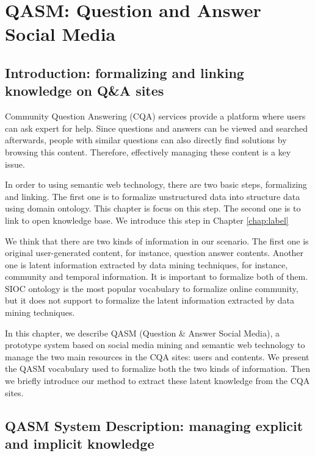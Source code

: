 \chapter{QASM: Question and Answer Social Media}
\doublespacing
\label{chap:qasm}
\minitoc

\section{Introduction: formalizing and linking knowledge on Q\&A sites}
Community Question Answering (CQA) services provide a platform where users can ask expert for help. Since questions and answers can be viewed and searched afterwards, people with similar questions can also directly find solutions by browsing this content. Therefore, effectively managing these content is a key issue. 

In order to using semantic web technology, there are two basic steps, formalizing and linking. The first one is to formalize unstructured data into structure data using domain ontology. This chapter is focus on this step. The second one is to link to open knowledge base. We introduce this step in Chapter \ref{chap:label}

We think that there are two kinds of information in our scenario. The first one is original user-generated content, for instance, question answer contents. Another one is latent information extracted by data mining techniques, for instance, community and temporal information. It is important to formalize both of them. SIOC ontology is the most popular vocabulary to formalize online community, but it does not support to formalize the latent information extracted by data mining techniques. 

In this chapter, we describe QASM (Question \& Answer Social Media), a prototype system based on social media mining and semantic web technology to manage the two main resources in the CQA sites: users and contents. We present the QASM vocabulary used to formalize both the two kinds of information. Then we briefly introduce our method to extract these latent knowledge from the CQA sites.


\section{QASM System Description: managing explicit and implicit knowledge}
